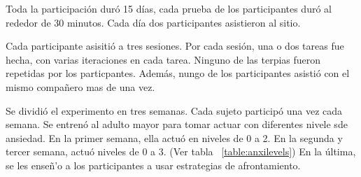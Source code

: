 
Toda la participaci\'on dur\'o 15 d\'ias, cada prueba de los participantes dur\'o al rededor de 30 minutos. Cada d\'ia dos participantes asistieron al sitio.

Cada participante asisiti\'o a tres sesiones. Por cada sesi\'on, una o dos tareas fue hecha, con varias iteraciones en cada tarea. Ninguno de las terpias fueron repetidas por los particpantes. Adem\'as, nungo de los participantes asisti\'o con el mismo compa\~nero mas de una vez.

Se dividi\'o el experimento en tres semanas. Cada sujeto particip\'o una vez cada semana. Se entren\'o al adulto mayor para tomar actuar con diferentes nivele sde ansiedad. En la primer semana, ella actu\'o en niveles de 0 a 2. En la segunda y tercer semana, actu\'o niveles de 0 a 3. (Ver tabla ~\ref{table:anxilevels}) En la \'ultima, se les ense\~n'o a los participantes a usar estrategias de afrontamiento.

